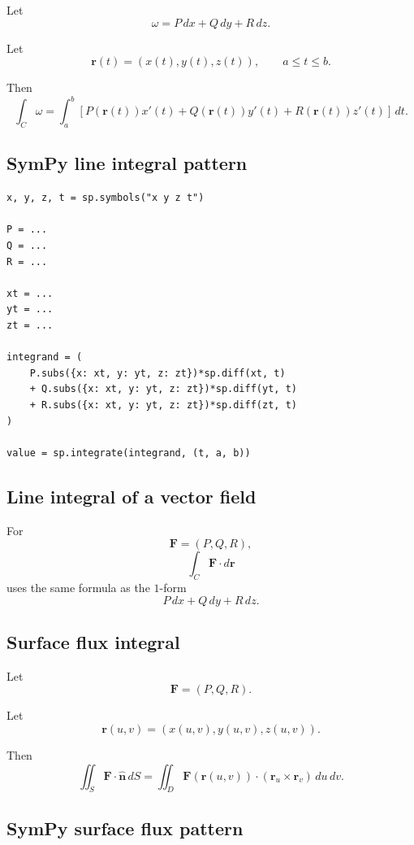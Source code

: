 Let
\[
    \omega=P\,dx+Q\,dy+R\,dz.
\]

Let
\[
    \mathbf r(t)=(x(t),y(t),z(t)),
    \qquad
    a\le t\le b.
\]

Then
\[
\boxed{
    \int_C\omega
    =
    \int_a^b
    \left[
    P(\mathbf r(t))x'(t)
    +
    Q(\mathbf r(t))y'(t)
    +
    R(\mathbf r(t))z'(t)
    \right]\,dt.
}
\]

\subsection*{SymPy line integral pattern}

\begin{verbatim}
x, y, z, t = sp.symbols("x y z t")

P = ...
Q = ...
R = ...

xt = ...
yt = ...
zt = ...

integrand = (
    P.subs({x: xt, y: yt, z: zt})*sp.diff(xt, t)
    + Q.subs({x: xt, y: yt, z: zt})*sp.diff(yt, t)
    + R.subs({x: xt, y: yt, z: zt})*sp.diff(zt, t)
)

value = sp.integrate(integrand, (t, a, b))
\end{verbatim}

\subsection*{Line integral of a vector field}

For
\[
    \mathbf F=(P,Q,R),
\]
\[
\boxed{
    \int_C\mathbf F\cdot d\mathbf r
}
\]
uses the same formula as the \(1\)-form
\[
    P\,dx+Q\,dy+R\,dz.
\]

\subsection*{Surface flux integral}

Let
\[
    \mathbf F=(P,Q,R).
\]

Let
\[
    \mathbf r(u,v)=(x(u,v),y(u,v),z(u,v)).
\]

Then
\[
\boxed{
    \iint_S\mathbf F\cdot\widehat{\mathbf n}\,dS
    =
    \iint_D
    \mathbf F(\mathbf r(u,v))
    \cdot
    (\mathbf r_u\times\mathbf r_v)
    \,du\,dv.
}
\]

\subsection*{SymPy surface flux pattern}

